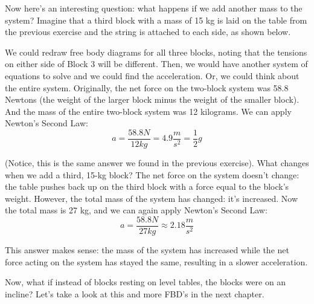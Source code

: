Now here's an interesting question: what happens if we add another mass to the 
system? Imagine that a third block with a mass of 15 kg is laid on the table 
from the previous exercise and the string is attached to each side, as shown 
below. 
\begin{center}
\end{center}

We could redraw free body diagrams for all three blocks, noting that the 
tensions on either side of Block 3 will be different. Then, we would have 
another system of equations to solve and we could find the acceleration. Or, 
we could think about the entire system. Originally, the net force on the 
two-block system was 58.8 Newtons (the weight of the larger block minus the 
weight of the smaller block). And the mass of the entire two-block system was 
12 kilograms. We can apply Newton's Second Law:
$$a = \frac{58.8 N}{12 kg} = 4.9 \frac{m}{s^2} = \frac{1}{2}g$$

(Notice, this is the same answer we found in the previous exercise). What 
changes when we add a third, 15-kg block? The net force on the system doesn't 
change: the table pushes back up on the third block with a force equal to the 
block's weight. However, the total mass of the system has changed: it's 
increased. Now the total mass is 27 kg, and we can again apply Newton's Second 
Law:
$$a = \frac{58.8 N}{27 kg} \approx 2.18 \frac{m}{s^2}$$

This answer makes sense: the mass of the system has increased while the net 
force acting on the system has stayed the same, resulting in a slower acceleration. 

Now, what if instead of blocks resting on level tables, the blocks were on an incline? Let's take a look at this and more FBD's in the next chapter.